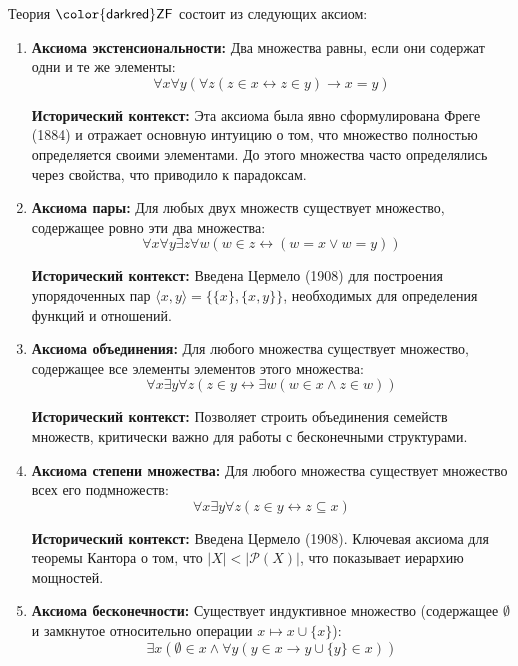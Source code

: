 \documentclass[11pt, a4paper]{extarticle}
\newcommand{\Pcal}{{\mathcal P}}
\newcommand{\ZF}{\ifmmode \mathsf{\color{darkred}ZF}\else ${\mathsf{\color{darkred}ZF}}$\fi\xspace}
\begin{document}
\begin{definition}[Аксиомы \ZF]
Теория \ZF состоит из следующих аксиом:
\begin{enumerate}
    \item \textbf{Аксиома экстенсиональности:} Два множества равны, если они содержат одни и те же элементы:
    $$\forall x \forall y (\forall z (z \in x \leftrightarrow z \in y) \rightarrow x = y)$$
    
    \textbf{Исторический контекст:} Эта аксиома была явно сформулирована Фреге (1884) и отражает основную интуицию о том, что множество полностью определяется своими элементами. До этого множества часто определялись через свойства, что приводило к парадоксам.
    
    \item \textbf{Аксиома пары:} Для любых двух множеств существует множество, содержащее ровно эти два множества:
    $$\forall x \forall y \exists z \forall w (w \in z \leftrightarrow (w = x \lor w = y))$$
    
    \textbf{Исторический контекст:} Введена Цермело (1908) для построения упорядоченных пар $\langle x,y \rangle = \{\{x\}, \{x,y\}\}$, необходимых для определения функций и отношений.
    
    \item \textbf{Аксиома объединения:} Для любого множества существует множество, содержащее все элементы элементов этого множества:
    $$\forall x \exists y \forall z (z \in y \leftrightarrow \exists w (w \in x \land z \in w))$$
    
    \textbf{Исторический контекст:} Позволяет строить объединения семейств множеств, критически важно для работы с бесконечными структурами.
    
    \item \textbf{Аксиома степени множества:} Для любого множества существует множество всех его подмножеств:
    $$\forall x \exists y \forall z (z \in y \leftrightarrow z \subseteq x)$$
    
    \textbf{Исторический контекст:} Введена Цермело (1908). Ключевая аксиома для теоремы Кантора о том, что $|X| < |\Pcal(X)|$, что показывает иерархию мощностей.
    
    \item \textbf{Аксиома бесконечности:} Существует индуктивное множество (содержащее $\emptyset$ и замкнутое относительно операции $x \mapsto x \cup \{x\}$):
    $$\exists x (\emptyset \in x \land \forall y (y \in x \rightarrow y \cup \{y\} \in x))$$
    

\end{enumerate}
\end{definition}
\end{document}
